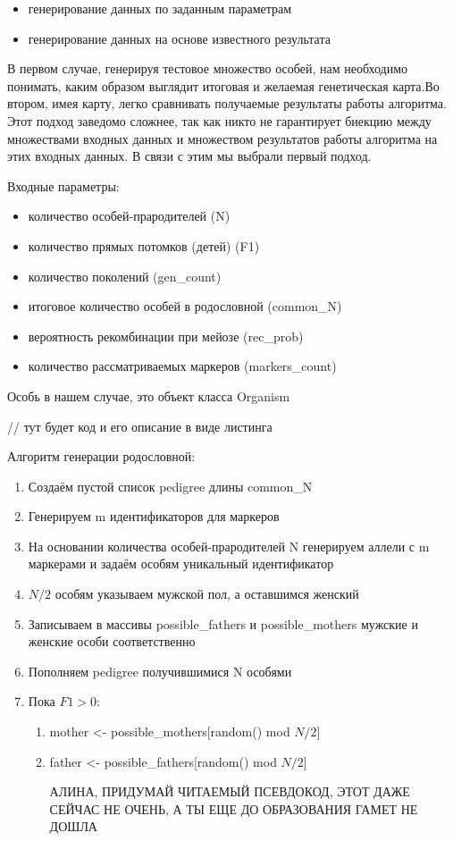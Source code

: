 \documentclass{matmex-diploma-custom}
\begin{document}
\begin{itemize}
\item генерирование данных по заданным параметрам
\item генерирование данных на основе известного результата
\end{itemize}

В первом случае, генерируя тестовое множество особей, нам необходимо
понимать, каким образом выглядит итоговая и желаемая генетическая
карта.Во втором, имея карту, легко сравнивать получаемые результаты
работы алгоритма. Этот подход заведомо сложнее, так как никто не
гарантирует биекцию между множествами входных данных и множеством
результатов работы алгоритма на этих входных данных.  В связи с этим
мы выбрали первый подход.

Входные параметры:
\begin{itemize}
\item количество особей-прародителей (N)
\item количество прямых потомков (детей) (F1)
\item количество поколений (gen\_count)
\item итоговое количество особей в родословной (common\_N)
\item вероятность рекомбинации при мейозе (rec\_prob)
\item количество рассматриваемых маркеров (markers\_count)
\end{itemize}

Особь в нашем случае, это объект класса Organism

// тут будет код и его описание в виде листинга

Алгоритм генерации родословной:
\begin{enumerate}
\item Создаём пустой список pedigree длины common\_N
\item Генерируем m идентификаторов для маркеров
\item На основании количества особей-прародителей N генерируем аллели
  с m маркерами и задаём особям уникальный идентификатор
\item $N / 2$ особям указываем мужской пол, а оставшимся женский
\item Записываем в массивы possible\_fathers и possible\_mothers
  мужские и женские особи соответственно
\item Пополняем pedigree получившимися N особями
\item Пока $F1 > 0$:
  \begin{enumerate}
  \item mother <- possible\_mothers[random() mod $N / 2$]
  \item father <- possible\_fathers[random() mod $N / 2$]

АЛИНА, ПРИДУМАЙ ЧИТАЕМЫЙ ПСЕВДОКОД, ЭТОТ ДАЖЕ СЕЙЧАС НЕ ОЧЕНЬ, А ТЫ
ЕЩЕ ДО ОБРАЗОВАНИЯ ГАМЕТ НЕ ДОШЛА

  \end{enumerate}

\end{enumerate}
\end{document}
